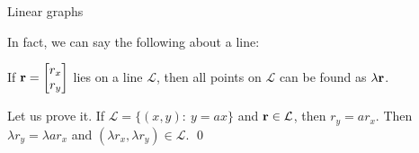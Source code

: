 \documentclass{beamer}
\begin{document}
\begin{frame}{Linear graphs}
	\begin{flushleft}
		
		In fact, we can say the following about a line:
		
		\begin{theorem}
			If $\mathbf{r} =
			\begin{bmatrix}
				r_x  \\
				r_y
			\end{bmatrix}$ lies on a line $\mathcal{L}$, then all points on $\mathcal{L}$ can be found as $\lambda \mathbf{r}$.
		\end{theorem}
	
		\bigskip
		
		Let us prove it. If $\mathcal{L} = \{(x, y): \ y = a x \}$ and $\mathbf{r} \in \mathcal{L}$, then $r_y = a r_x$. Then $\lambda r_y = \lambda a r_x$ and $(\lambda r_x, \lambda r_y) \in \mathcal{L}$. \qed
		
		
	\end{flushleft}
\end{frame}
\end{document}
